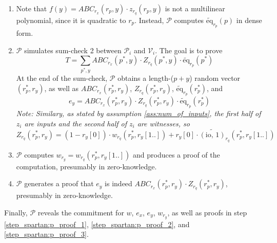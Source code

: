 \documentclass{article}
\renewcommand{\P}{\mathcal{P}}
\newcommand{\V}{\mathcal{V}}
\newcommand{\eq}{\widetilde{\mbox{eq}}}
\newcommand{\io}{\widetilde{(\mbox{io, 1})}}
\begin{document}
\begin{enumerate}
    \item Note that $f(y) = ABC_{r_x}(r_p, y)\cdot z_{r_q}(r_p, y)$ is not a multilinear polynomial, since it is quadratic to $r_p$. Instead, $\P$ computes $\eq_{r_p}(p)$ in dense form.
    \item $\P$ simulates sum-check 2 between $\P_i$ and $\V_i$. The goal is to prove
    $$\displaystyle T = \sum_{p^*, y} ABC_{r_x}(p^*, y)\cdot Z_{r_q}(p^*, y) \cdot \eq_{r_p}(p^*)$$
    At the end of the sum-check, $\P$ obtains a length-($p + y$) random vector $(r_p^*, r_y)$, as well as $ABC_{r_x}(r_p^*, r_y)$, $Z_{r_q}(r_p^*, r_y)$, $\eq_{r_p}(r_p^*)$, and
    $$e_y = ABC_{r_x}(r_p^*, r_y)\cdot Z_{r_q}(r_p^*, r_y)\cdot \eq_{r_p}(r_p^*)$$
    \emph{Note: Similary, as stated by assumption \ref{ass:num_of_inputs}, the first half of $z_i$ are inputs and the second half of $z_i$ are witnesses, so $Z_{r_q}(r_p^*, r_y) = (1 - r_y[0])\cdot w_{r_q}(r_p^*, r_y[1..]) + r_y[0]\cdot \io_{r_q}(r_p^*, r_y[1..])$}
    \item $\P$ computes $w_{r_y} = w_{r_q}(r_p^*, r_y[1..])$ and produces a proof of the computation, presumably in zero-knowledge.\label{step:p_proof_2}
    \item $\P$ generates a proof that $e_y$ is indeed $ABC_{r_x}(r_p^*, r_y)\cdot Z_{r_q}(r_p^*, r_y)$, presumably in zero-knowledge.\label{step:p_proof_3}
\end{enumerate}
Finally, $\P$ reveals the commitment for $w$, $e_x$, $e_y$, $w_{r_y}$, as well as proofs in step \ref{step_spartan:p_proof_1}, \ref{step_spartan:p_proof_2}, and \ref{step_spartan:p_proof_3}.
\end{document}
